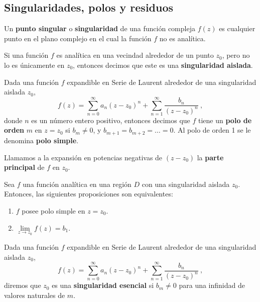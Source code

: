 \subsection{Singularidades, polos y residuos}

\begin{defi}
    Un \textbf{punto singular} o \textbf{singularidad} de una función compleja $f(z)$ es cualquier punto en el plano complejo en el cual la función $f$ no es analítica.
\end{defi}

\begin{defi}
    Si una función $f$ es analítica en una vecindad alrededor de un punto $z_0$, pero no lo es únicamente en $z_0$, entonces decimos que este es una \textbf{singularidad aislada}. 
\end{defi}

\begin{defi}
    Dada una función $f$ expandible en Serie de Laurent alrededor de una singularidad aislada $z_0$, 
    \begin{equation}
        f(z) = \sum_{n=0}^\infty a_n(z-z_0)^n + \sum_{n=1}^\infty \frac{b_n}{(z-z_0)^n} \ ,
    \end{equation}
    donde $n$ es un número entero positivo, entonces decimos que $f$ tiene un \textbf{polo de orden} $m$ en $z=z_0$ si $b_m \neq 0$, y $b_{m+1} = b_{m+2} = \dots = 0$. Al polo de orden 1 se le denomina \textbf{polo simple}.

    Llamamos a la expansión en potencias negativas de $(z-z_0)$ la \textbf{parte principal} de $f$ en $z_0$.
\end{defi}

\begin{teorema}
    Sea $f$ una función analítica en una región $D$ con una singularidad aislada $z_0$. Entonces, las siguientes proposiciones son equivalentes:
    \begin{enumerate}
        \item $f$ posee polo simple en $z = z_0$.
        \item $\lim\limits_{z \to z_0} f(z) = b_1$.
    \end{enumerate}
\end{teorema}

\begin{defi}
    Dada una función $f$ expandible en Serie de Laurent alrededor de una singularidad aislada $z_0$, 
    \begin{equation}
        f(z) = \sum_{n=0}^\infty a_n(z-z_0)^n + \sum_{n=1}^\infty \frac{b_n}{(z-z_0)^n} \ ,
    \end{equation}
    diremos que $z_0$ es una \textbf{singularidad esencial} si $b_m \neq 0$ para una infinidad de valores naturales de $m$.
\end{defi}


